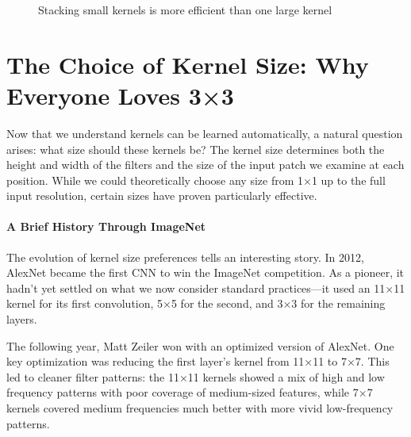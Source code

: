 \documentclass{article}
\begin{document}
\begin{figure}[h]
\centering
{}
\caption{Stacking small kernels is more efficient than one large kernel}
\end{figure}











\newpage
\appendix
\section{The Choice of Kernel Size: Why Everyone Loves 3×3}\label{app:3x3}

Now that we understand kernels can be learned automatically, a natural question arises: what size should these kernels be? The kernel size determines both the height and width of the filters and the size of the input patch we examine at each position. While we could theoretically choose any size from 1×1 up to the full input resolution, certain sizes have proven particularly effective.

\paragraph{A Brief History Through ImageNet}

The evolution of kernel size preferences tells an interesting story. In 2012, AlexNet became the first CNN to win the ImageNet competition. As a pioneer, it hadn't yet settled on what we now consider standard practices—it used an 11×11 kernel for its first convolution, 5×5 for the second, and 3×3 for the remaining layers.

The following year, Matt Zeiler won with an optimized version of AlexNet. One key optimization was reducing the first layer's kernel from 11×11 to 7×7. This led to cleaner filter patterns: the 11×11 kernels showed a mix of high and low frequency patterns with poor coverage of medium-sized features, while 7×7 kernels covered medium frequencies much better with more vivid low-frequency patterns.
\end{document}
